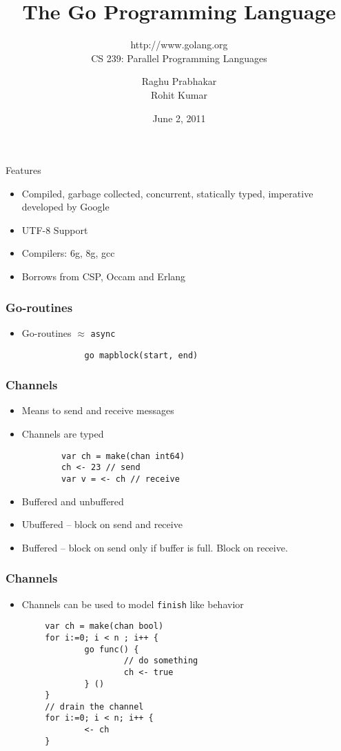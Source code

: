 \documentclass{beamer}
\title{The Go Programming Language}
\subtitle{http://www.golang.org \\ CS 239: Parallel Programming Languages}
\author{Raghu Prabhakar \\ Rohit Kumar}
\date{June 2, 2011}
\begin{document}
\begin{frame}
\titlepage
\end{frame}

\begin{frame} {Features}
\begin{itemize}
  \item Compiled, garbage collected, concurrent, statically typed,
    imperative developed by Google
  \item UTF-8 Support
  \item Compilers: 6g, 8g, gcc 
  \item Borrows from CSP, Occam and Erlang
\end{itemize}
\end{frame}

\begin{frame} [fragile]
\frametitle{Go-routines}
\begin{itemize}
  \item Go-routines $\approx$ \verb=async=
\end{itemize}
\begin{center}
\begin{verbatim}
                go mapblock(start, end)
\end{verbatim}
\end{center}
\end{frame}

\begin{frame} [fragile]
\frametitle{Channels}
\begin{itemize}
\item Means to send and receive messages
\item Channels are typed

\begin{verbatim}
        var ch = make(chan int64) 
        ch <- 23 // send 
        var v = <- ch // receive        
\end{verbatim}

\item Buffered and unbuffered
\item Ubuffered -- block on send and receive
\item Buffered  -- block on send only if buffer is full. Block on receive.

\end{itemize}
\end{frame}

\begin{frame}[fragile]
\frametitle{Channels}
\begin{itemize}
\item Channels can be used to model \verb=finish= like behavior
\end{itemize}
\begin{verbatim}
        var ch = make(chan bool)
        for i:=0; i < n ; i++ {
                go func() { 
                        // do something
                        ch <- true
                } ()
        }
        // drain the channel
        for i:=0; i < n; i++ {
                <- ch
        }
        
\end{verbatim}
\end{frame}
\end{document}
